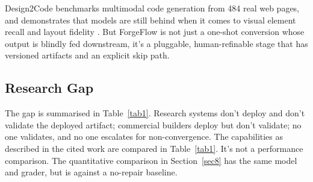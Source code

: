 \documentclass[pdflatex,sn-mathphys-num]{sn-jnl}%
\theoremstyle{thmstyleone}%
\theoremstyle{thmstyletwo}%
\theoremstyle{thmstylethree}%
\begin{document}
Design2Code benchmarks multimodal code generation from 484 real web pages, and demonstrates that models are still behind when it comes to visual element recall and layout fidelity \cite{r23si}. But ForgeFlow is not just a one-shot conversion whose output is blindly fed downstream, it's a pluggable, human-refinable stage that has versioned artifacts and an explicit skip path.

\subsection{Research Gap}\label{sec2.6}

The gap is summarised in Table~\ref{tab1}. Research systems don't deploy and don't validate the deployed artifact; commercial builders deploy but don't validate; no one validates, and no one escalates for non-convergence. The capabilities as described in the cited work are compared in Table~\ref{tab1}. It's not a performance comparison. The quantitative comparison in Section~\ref{sec8} has the same model and grader, but is against a no-repair baseline.
\end{document}
